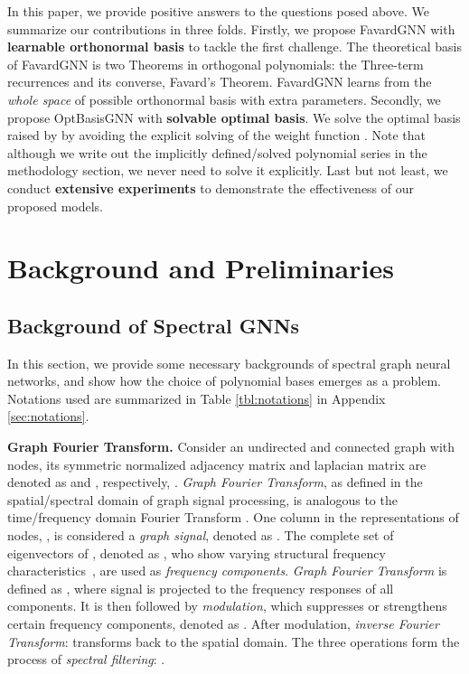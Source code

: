  


In this paper, we provide positive answers to the questions
posed above. We summarize our contributions in three folds. 
Firstly, we propose FavardGNN with  \textbf{learnable orthonormal basis} to tackle the first challenge. The theoretical basis of 
FavardGNN is two Theorems in orthogonal polynomials: the Three-term recurrences and its converse, Favard's Theorem. FavardGNN learns from the \textit{whole space} of possible orthonormal basis with  extra parameters.
Secondly, we propose OptBasisGNN with \textbf{solvable optimal basis}. 
We solve the optimal basis raised by \citet{Wang2022jacobi} by avoiding the explicit solving of the weight function 
. 
Note that although we write out the implicitly defined/solved polynomial series in the methodology section, 
we never need to solve it explicitly.   
Last but not least, we conduct \textbf{extensive experiments}
to 
demonstrate the effectiveness of our proposed models.

 \section{Background and Preliminaries}
\subsection{Background of Spectral GNNs}
\label{sec:background_spectral}
In this section, 
we provide some necessary backgrounds of spectral graph neural networks, 
and show how the choice of polynomial bases emerges as a problem. 
Notations used are summarized in 
Table \ref{tbl:notations} in 
Appendix \ref{sec:notations}.

\textbf{Graph Fourier Transform.\quad}
Consider an undirected and connected graph  with  nodes, 
its symmetric normalized adjacency matrix 
and laplacian matrix are denoted as
 and , respectively, .
\textit{Graph Fourier Transform}, as defined in the spatial/spectral domain of graph signal processing, is analogous to the time/frequency domain Fourier Transform
\cite{Hammond2009, Shuman2013}
. 
One column in the representations of  nodes, 
, 
is considered a \textit{graph signal}, 
denoted as .
The complete set of  eigenvectors of , denoted as ,
who show varying structural frequency characteristics~\cite{Shuman2013},
are used as \textit{frequency components}.
\textit{Graph Fourier Transform} 
is defined as ,
where signal  is projected to the frequency responses of all components.
It is then followed by 
\textit{modulation},
which suppresses or strengthens certain frequency components, 
denoted as  
.
After modulation, \textit{inverse Fourier Transform}:
 transforms 
back to the spatial domain.
The three operations form the process of \textit{spectral filtering}:
.




